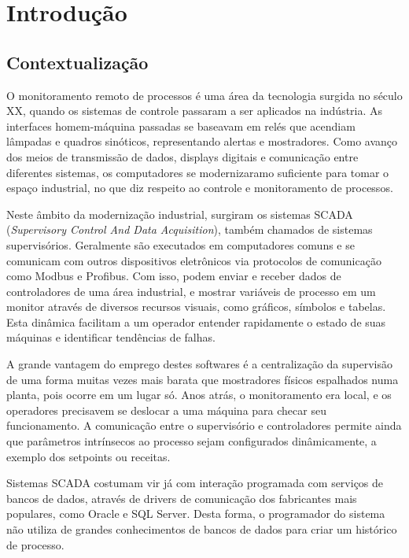 \chapter{Introdução} \label{Chap:Introdução}

\section{Contextualização}

O monitoramento remoto de processos é uma área da tecnologia surgida no século XX, quando os sistemas de controle passaram a ser aplicados na indústria. As interfaces homem-máquina passadas se baseavam em relés que acendiam lâmpadas e quadros sinóticos, representando alertas e mostradores. Como avanço dos meios de transmissão de dados, displays digitais e comunicação entre diferentes sistemas, os computadores se modernizaramo suficiente para tomar o espaço industrial, no que diz respeito ao controle e monitoramento de processos. \cite{junior2019}

Neste âmbito da modernização industrial, surgiram os sistemas SCADA (\emph{Supervisory Control And Data Acquisition}), também chamados de sistemas supervisórios. Geralmente são executados em computadores comuns e se comunicam com outros dispositivos eletrônicos via protocolos de comunicação como Modbus e Profibus. Com isso, podem enviar e receber dados de controladores de uma área industrial, e mostrar variáveis de processo em um monitor através de diversos recursos visuais, como gráficos, símbolos e tabelas. Esta dinâmica facilitam a um operador entender rapidamente o estado de suas máquinas e identificar tendências de falhas.

A grande vantagem do emprego destes softwares é a centralização da supervisão de uma forma muitas vezes mais barata que mostradores físicos espalhados numa planta, pois ocorre em um lugar só. Anos atrás, o monitoramento era local, e os operadores precisavem se deslocar a uma máquina para checar seu funcionamento. A comunicação entre o supervisório e controladores permite ainda que parâmetros intrínsecos ao processo sejam configurados dinâmicamente, a exemplo dos setpoints ou receitas.

Sistemas SCADA costumam vir já com interação programada com serviços de bancos de dados, através de drivers de comunicação dos fabricantes mais populares, como Oracle e SQL Server. Desta forma, o programador do sistema não utiliza de grandes conhecimentos de bancos de dados para criar um histórico de processo.

